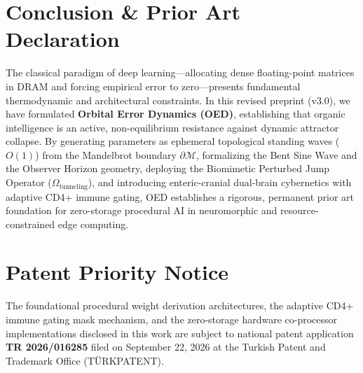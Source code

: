 \documentclass[10pt,journal,compsoc,twocolumn]{article}
\begin{document}
\section{Conclusion \& Prior Art Declaration}
\label{sec:conclusion}
The classical paradigm of deep learning---allocating dense floating-point matrices in DRAM and forcing empirical error to zero---presents fundamental thermodynamic and architectural constraints. In this revised preprint (v3.0), we have formulated \textbf{Orbital Error Dynamics (OED)}, establishing that organic intelligence is an active, non-equilibrium resistance against dynamic attractor collapse. By generating parameters as ephemeral topological standing waves ($O(1)$) from the Mandelbrot boundary $\partial \mathcal{M}$, formalizing the Bent Sine Wave and the Observer Horizon geometry, deploying the Biomimetic Perturbed Jump Operator ($\Omega_{\mathrm{tunneling}}$), and introducing enteric-cranial dual-brain cybernetics with adaptive CD4+ immune gating, OED establishes a rigorous, permanent prior art foundation for zero-storage procedural AI in neuromorphic and resource-constrained edge computing.

\section*{Patent Priority Notice}
The foundational procedural weight derivation architectures, the adaptive CD4+ immune gating mask mechanism, and the zero-storage hardware co-processor implementations disclosed in this work are subject to national patent application \textbf{TR 2026/016285} filed on September 22, 2026 at the Turkish Patent and Trademark Office (TÜRKPATENT).



\end{document}
